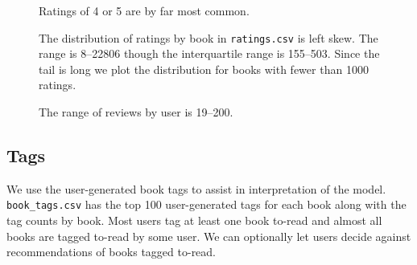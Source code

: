\documentclass[11pt]{article}
\begin{document}
\begin{figure}
    \begin{center}
    \end{center}
    \caption[Distribution of User Ratings]{Ratings of 4 or 5 are by far most common.}
     \label{fig:average-rating-reviews-count}
\end{figure}


\begin{figure}
    \begin{center}
    \end{center}
    \caption[Distribution of Ratings by Book]{The distribution of ratings by book in \texttt{ratings.csv} is left
skew. The range is 8--22806 though the interquartile range is 155--503. Since the tail is long we plot the distribution for books with fewer
than 1000 ratings.}
     \label{fig:ratings-by-book}
\end{figure}



\begin{figure}
    \begin{center}
    \end{center}
    \caption[Distribution of Ratings by User]{The range of reviews by user is 19--200.}
     \label{fig:ratings-by-user}
\end{figure}

    
    \hypertarget{tags}{%
\subsection{Tags}\label{tags}}

We use the user-generated book tags to assist in interpretation of the model. 
\texttt{book\_tags.csv} has the top 100 user-generated tags for each book along with the tag counts by book.
Most users tag at least one book to-read and almost all books are
tagged to-read by some user.
We can optionally let users decide against recommendations of books tagged to-read.


\end{document}
